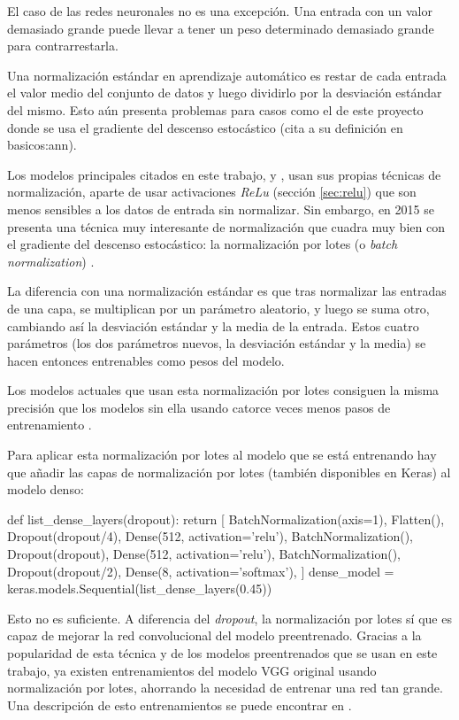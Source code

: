 El caso de las redes neuronales no es una excepción. Una entrada con un valor demasiado grande puede llevar a tener un peso determinado demasiado grande para contrarrestarla.

Una normalización estándar en aprendizaje automático es restar de cada entrada el valor medio del conjunto de datos y luego dividirlo por la desviación estándar del mismo. Esto aún presenta problemas para casos como el de este proyecto donde se usa el gradiente del descenso estocástico (cita a su definición en basicos:ann).

Los modelos principales citados en este trabajo, \parencite{krizhevsky2012imagenet} y \parencite{simonyan}, usan sus propias técnicas de normalización, aparte de usar activaciones \textit{ReLu} (sección \ref{sec:relu}) que son menos sensibles a los datos de entrada sin normalizar. Sin embargo, en 2015 se presenta una técnica muy interesante de normalización que cuadra muy bien con el gradiente del descenso estocástico: la normalización por lotes (o \textit{batch normalization}) \parencite{batch_normalization}.

La diferencia con una normalización estándar es que tras normalizar las entradas de una capa, se multiplican por un parámetro aleatorio, y luego se suma otro, cambiando así la desviación estándar y la media de la entrada. Estos cuatro parámetros (los dos parámetros nuevos, la desviación estándar y la media) se hacen entonces entrenables como pesos del modelo.

Los modelos actuales que usan esta normalización por lotes consiguen la misma precisión que los modelos sin ella usando catorce veces menos pasos de entrenamiento \parencite{batch_normalization}.

Para aplicar esta normalización por lotes al modelo que se está entrenando hay que añadir las capas de normalización por lotes (también disponibles en Keras) al modelo denso:

\begin{python}
def list_dense_layers(dropout):
    return [
        BatchNormalization(axis=1),
        Flatten(),
        Dropout(dropout/4),
        Dense(512, activation='relu'),
        BatchNormalization(),
        Dropout(dropout),
        Dense(512, activation='relu'),
        BatchNormalization(),
        Dropout(dropout/2),
        Dense(8, activation='softmax'),
    ]
dense_model = keras.models.Sequential(list_dense_layers(0.45))
\end{python}

Esto no es suficiente. A diferencia del \textit{dropout}, la normalización por lotes sí que es capaz de mejorar la red convolucional del modelo preentrenado. Gracias a la popularidad de esta técnica y de los modelos preentrenados que se usan en este trabajo, ya existen entrenamientos del modelo VGG original usando normalización por lotes, ahorrando la necesidad de entrenar una red tan grande. Una descripción de esto entrenamientos se puede encontrar en \parencite{pretrained_with_bn}.

